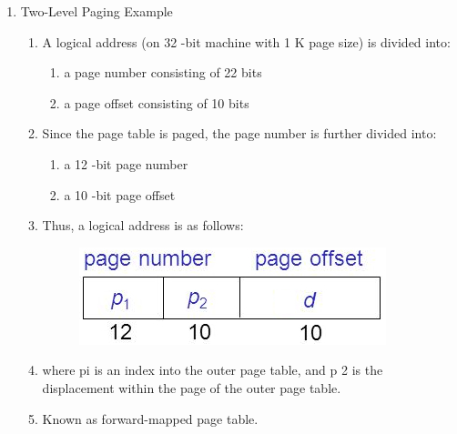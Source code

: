 \begin{enumerate}
  \item Two-Level Paging Example
  \begin{enumerate}
    \item  A logical address (on 32 -bit machine with 1 K page size) is divided into:
    \begin{enumerate}
      \item a page number consisting of 22 bits
      \item a page offset consisting of 10 bits
    \end{enumerate}
    \item Since the page table is paged, the page number is further divided into:
    \begin{enumerate}
        \item a 12 -bit page number
        \item a 10 -bit page offset
    \end{enumerate}
  \item Thus, a logical address is as follows:
    \begin{figure}[h]
        \centering   \includegraphics[scale=2.5]{./images/paging_02.jpeg}
    \end{figure}
  \item where pi is an index into the outer page table, and p 2 is the displacement within the page of the outer page table.
  \item Known as forward-mapped page table.
  \end{enumerate}

\end{enumerate}








